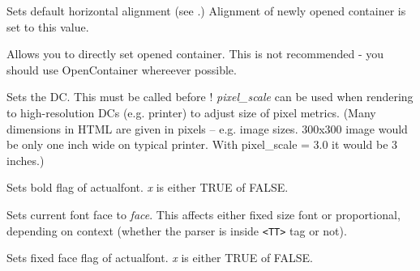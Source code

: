 \label{wxhtmlwinparsersetalign}


Sets default horizontal alignment (see
.)
Alignment of newly opened container is set to this value.


\label{wxhtmlwinparsersetcontainer}


Allows you to directly set opened container. This is not recommended - you should use OpenContainer
whereever possible.


\label{wxhtmlwinparsersetdc}


Sets the DC. This must be called before !
{\it pixel\_scale}  can be used when rendering to high-resolution 
DCs (e.g. printer) to adjust size of pixel metrics. (Many dimensions in 
HTML are given in pixels -- e.g. image sizes. 300x300 image would be only one
inch wide on typical printer. With pixel\_scale = 3.0 it would be 3 inches.)


\label{wxhtmlwinparsersetfontbold}


Sets bold flag of actualfont. {\it x} is either TRUE of FALSE.

\label{wxhtmlwinparsersetfontface}


Sets current font face to {\it face}. This affects either fixed size
font or proportional, depending on context (whether the parser is 
inside {\tt <TT>} tag or not).

\label{wxhtmlwinparsersetfontfixed}


Sets fixed face flag of actualfont. {\it x} is either TRUE of FALSE.

\label{wxhtmlwinparsersetfontitalic}

